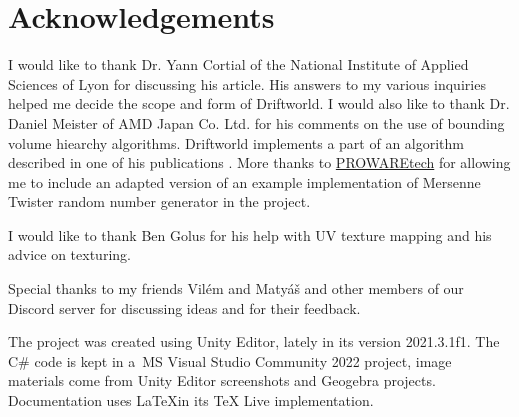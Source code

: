 \section*{Acknowledgements}

I would like to thank Dr. Yann Cortial of the National Institute of Applied Sciences of Lyon for discussing his article. His answers to my various inquiries helped me decide the scope and form of Driftworld. I would also like to thank Dr. Daniel Meister of AMD Japan Co. Ltd. for his comments on the use of bounding volume hiearchy algorithms. Driftworld implements a part of an algorithm described in one of his publications \cite{meister}. More thanks to \href{https://www.prowaretech.com}{PROWAREtech} for allowing me to include an adapted version of an example implementation of Mersenne Twister random number generator in the project.

I would like to thank Ben Golus for his help with UV texture mapping and his advice on texturing. %

Special thanks to my friends Vilém and Matyáš and other members of our Discord server for discussing ideas and for their feedback.

The project was created using Unity Editor, lately in its version 2021.3.1f1. The C\# code is kept in a~MS Visual Studio Community 2022 project, image materials come from Unity Editor screenshots and Geogebra projects. Documentation uses \LaTeX\hspace*{0.3em}in its TeX Live implementation.